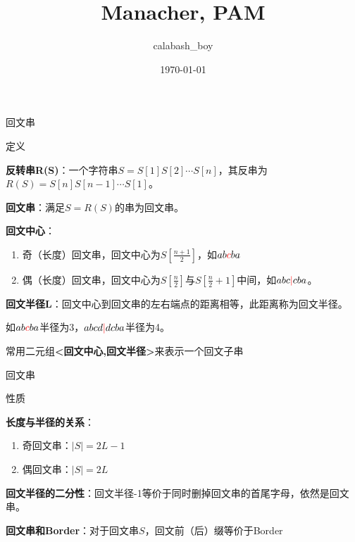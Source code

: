 \documentclass{ctexbeamer}		%
\date{}	%
\title[String]{Manacher, PAM}	%
\author[calabash\_boy]{calabash\_boy} %
\date{\today}
\begin{document}


\begin{frame}	

\titlepage	%
	
\end{frame}		

\begin{frame}{回文串}

\begin{block}{定义}

\textbf{反转串R(S)}：一个字符串$S = S[1]S[2]\cdots S[n]$，其反串为$R(S) = S[n]S[n-1]\cdots S[1]$。

\textbf{回文串}：满足$S = R(S)$的串为回文串。

\pause

\textbf{回文中心}：

\begin{enumerate}
    \item 奇（长度）回文串，回文中心为$S[\frac{n+1}{2}]$，如$ab{\color{red}c}ba$
    \item 偶（长度）回文串，回文中心为$S[\frac{n}{2}]$与$S[\frac{n}{2} + 1]$中间，如$abc{\color{red}{|}}cba$。
\end{enumerate}

\pause

\textbf{回文半径L}：回文中心到回文串的左右端点的距离相等，此距离称为回文半径。

如$ab{\color{red}{c}}ba$半径为3，$abcd{\color{red}|}dcba$半径为4。

\pause

常用二元组\textbf{<回文中心,回文半径>}来表示一个回文子串
\end{block}
    
\end{frame}

\begin{frame}{回文串}

\begin{block}{性质}

\textbf{长度与半径的关系}：
\begin{enumerate}
    \item 奇回文串：$|S| = 2L - 1$
    \item 偶回文串：$|S| = 2L$
\end{enumerate}

\pause

\textbf{回文半径的二分性}：回文半径-1等价于同时删掉回文串的首尾字母，依然是回文串。

\pause

\textbf{回文串和Border}：对于回文串$S$，回文前（后）缀{\color{red}等价于}Border

\end{block}    
    
\end{frame}
\end{document}
